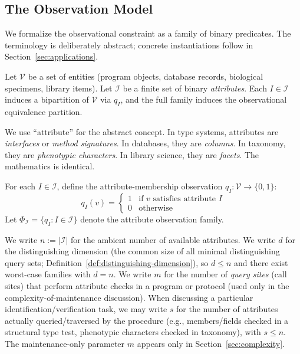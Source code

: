 \subsection{The Observation Model}

We formalize the observational constraint as a family of binary predicates. The terminology is deliberately abstract; concrete instantiations follow in Section~\ref{sec:applications}.

\begin{definition}
Let $\mathcal{V}$ be a set of entities (program objects, database records, biological specimens, library items). Let $\mathcal{I}$ be a finite set of binary \emph{attributes}. Each $I \in \mathcal{I}$ induces a bipartition of $\mathcal{V}$ via $q_I$, and the full family induces the observational equivalence partition.
\end{definition}

\begin{remark}[Terminology]
We use ``attribute'' for the abstract concept. In type systems, attributes are \emph{interfaces} or \emph{method signatures}. In databases, they are \emph{columns}. In taxonomy, they are \emph{phenotypic characters}. In library science, they are \emph{facets}. The mathematics is identical.
\end{remark}

\begin{definition}
For each $I \in \mathcal{I}$, define the attribute-membership observation $q_I: \mathcal{V} \to \{0,1\}$:
\[
q_I(v) = \begin{cases} 1 & \text{if } v \text{ satisfies attribute } I \\ 0 & \text{otherwise} \end{cases}
\]
Let $\Phi_{\mathcal{I}} = \{q_I : I \in \mathcal{I}\}$ denote the attribute observation family.
\end{definition}

\begin{remark}
We write $n := |\mathcal{I}|$ for the ambient number of available attributes. We write $d$ for the distinguishing dimension (the common size of all minimal distinguishing query sets; Definition~\ref{def:distinguishing-dimension}), so $d \le n$ and there exist worst-case families with $d = n$. We write $m$ for the number of \emph{query sites} (call sites) that perform attribute checks in a program or protocol (used only in the complexity-of-maintenance discussion).
When discussing a particular identification/verification task, we may write $s$ for the number of attributes actually queried/traversed by the procedure (e.g., members/fields checked in a structural type test, phenotypic characters checked in taxonomy), with $s \le n$. The maintenance-only parameter $m$ appears only in Section~\ref{sec:complexity}.
\end{remark}

